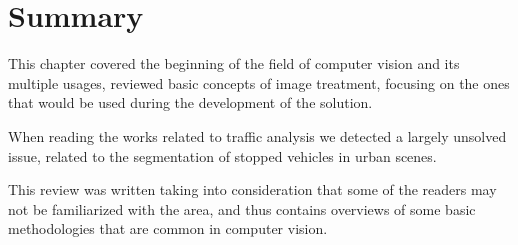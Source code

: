 \section{Summary}

This chapter covered the beginning of the field of computer vision and its multiple usages, reviewed basic concepts of image treatment, focusing on the ones that would be used during the development of the solution. 

When reading the works related to traffic analysis we detected a largely unsolved issue, related to the segmentation of stopped vehicles in urban scenes. 

This review was written taking into consideration that some of the readers may not be familiarized with the area, and thus contains overviews of some basic methodologies that are common in computer vision.
